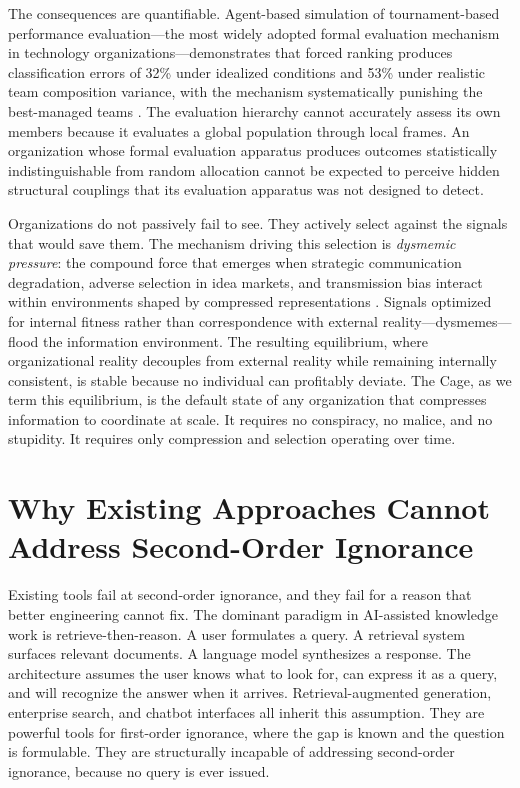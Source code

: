 \documentclass[11pt,a4paper]{article}
\begin{document}
The consequences are quantifiable. Agent-based simulation of tournament-based performance evaluation---the most widely adopted formal evaluation mechanism in technology organizations---demonstrates that forced ranking produces classification errors of 32\% under idealized conditions and 53\% under realistic team composition variance, with the mechanism systematically punishing the best-managed teams \citep{mcentire2025c}. The evaluation hierarchy cannot accurately assess its own members because it evaluates a global population through local frames. An organization whose formal evaluation apparatus produces outcomes statistically indistinguishable from random allocation cannot be expected to perceive hidden structural couplings that its evaluation apparatus was not designed to detect.

Organizations do not passively fail to see. They actively select against the signals that would save them. The mechanism driving this selection is \emph{dysmemic pressure}: the compound force that emerges when strategic communication degradation, adverse selection in idea markets, and transmission bias interact within environments shaped by compressed representations \citep{mcentire2025a}. Signals optimized for internal fitness rather than correspondence with external reality---dysmemes---flood the information environment. The resulting equilibrium, where organizational reality decouples from external reality while remaining internally consistent, is stable because no individual can profitably deviate. The Cage, as we term this equilibrium, is the default state of any organization that compresses information to coordinate at scale. It requires no conspiracy, no malice, and no stupidity. It requires only compression and selection operating over time.


\section{Why Existing Approaches Cannot Address Second-Order Ignorance}
\label{sec:existing}

Existing tools fail at second-order ignorance, and they fail for a reason that better engineering cannot fix. The dominant paradigm in AI-assisted knowledge work is retrieve-then-reason. A user formulates a query. A retrieval system surfaces relevant documents. A language model synthesizes a response. The architecture assumes the user knows what to look for, can express it as a query, and will recognize the answer when it arrives. Retrieval-augmented generation, enterprise search, and chatbot interfaces all inherit this assumption. They are powerful tools for first-order ignorance, where the gap is known and the question is formulable. They are structurally incapable of addressing second-order ignorance, because no query is ever issued.
\end{document}
